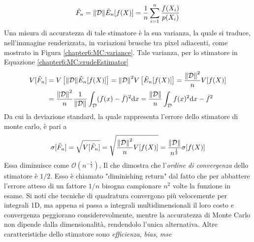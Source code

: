 \begin{equation}\label{chapter6:MC:importanceEstimator}
	\tilde{F}_n=\norm{\mathcal{D}}\tilde{E}_n[f(X)]=\frac{1}{n}\sum_{i=1}^n\frac{f(X_i)}{p(X_i)}
\end{equation}
Una misura di accuratezza di tale stimatore \`e la sua varianza, la quale si traduce, nell'immagine renderizzata, in variazioni brusche tra pixel 
adiacenti, come mostrato in Figura \ref{chapter6:MC:variance}. Tale varianza\footnotemark{}, per lo stimatore in 
Equazione \ref{chapter6:MC:crudeEstimator}
\begin{align}\label{chapter6:MC:crudeVariance}
	V[\tilde{F}_n]&=V\left[\norm{\mathcal{D}}\tilde{E}_n[f(X)]\right]=\norm{\mathcal{D}}^2V\left[\tilde{E}_n[f(X)]\right]%
	=\frac{\norm{\mathcal{D}}^2}{n}V[f(X)] \\
	&=\frac{\norm{\mathcal{D}}^2}{n}\frac{1}{\norm{\mathcal{D}}}\int_{\mathcal{D}}(f(x)-\bar{f})^2\mathrm{d}x=
	\frac{\norm{\mathcal{D}}}{n}\int_{\mathcal{D}}f(x)^2\mathrm{d}x-\bar{f}^2 \nonumber
\end{align}
Da cui la deviazione standard, la quale rappresenta l'errore dello stimatore di monte carlo, \`e pari a
\begin{equation}
	\sigma[\tilde{F}_n]=\sqrt{V[\tilde{F}_n]}=\sqrt{\frac{\norm{\mathcal{D}}^2}{n}V[f(X)]}=\frac{\norm{\mathcal{D}}}{n^{\frac{1}{2}}}\sigma[f(X)]
\end{equation}
Essa diminuisce come \mbox{$\mathcal{O}\left(n^{-\frac{1}{2}}\right)$}, Il che dimostra che l'\textit{ordine di convergenza} dello stimatore \`e 
$1/2$. Esso \`e chiamato "diminishing return" dal fatto che 
per abbattere l'errore atteso di un fattore $1/n$ bisogna campionare $n^2$ volte la funzione in esame. Si noti che tecniche di quadratura 
convergono pi\`u velocemente per integrali 1D, ma appena si passa a integrali multidimensionali il loro costo e convergenza peggiorano 
considerevolmente, mentre la accuratezza di Monte Carlo non dipende dalla dimensionalit\`a, rendendolo l'unica alternativa.
Altre caratteristiche dello stimatore sono \textit{efficienza}, \textit{bias}, \textit{mse}
